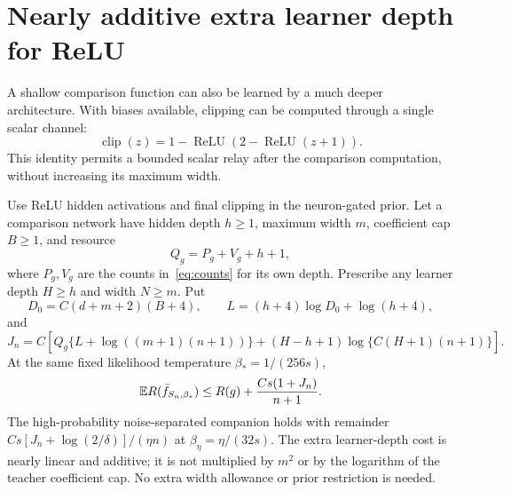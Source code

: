 \section{Nearly additive extra learner depth for ReLU}
A shallow comparison function can also be learned by a much deeper architecture. With biases available, clipping can be computed through a single scalar channel:
\begin{equation}
 \operatorname{clip}(z)=1-\operatorname{ReLU}\!\left(2-\operatorname{ReLU}(z+1)\right).
 \label{eq:scalar-reset}
\end{equation}
This identity permits a bounded scalar relay after the comparison computation, without increasing its maximum width.

\begin{theorem}\label{thm:scalar-padding}
Use ReLU hidden activations and final clipping in the neuron-gated prior. Let a comparison network have hidden depth $h\ge1$, maximum width $m$, coefficient cap $B\ge1$, and resource
\[
 Q_g=P_g+V_g+h+1,
\]
where $P_g,V_g$ are the counts in~\eqref{eq:counts} for its own depth. Prescribe any learner depth $H\ge h$ and width $N\ge m$. Put
\[
 D_0=C(d+m+2)(B+4),\qquad L=(h+4)\log D_0+\log(h+4),
\]
and
\begin{equation}
 J_n=C\left[
 Q_g\{L+\log((m+1)(n+1))\}
 +(H-h+1)\log\{C(H+1)(n+1)\}\right].
 \label{eq:scalar-padding-cost}
\end{equation}
At the same fixed likelihood temperature $\beta_*=1/(256s)$,
\[
 \mathbb E R(\bar f_{S_n,\beta_*})
 \le R(g)+\frac{C s(1+J_n)}{n+1}.
\]
The high-probability noise-separated companion holds with remainder
$Cs[J_n+\log(2/\delta)]/(\eta n)$ at $\beta_\eta=\eta/(32s)$.
The extra learner-depth cost is nearly linear and additive; it is not multiplied by $m^2$ or by the logarithm of the teacher coefficient cap. No extra width allowance or prior restriction is needed.
\end{theorem}
